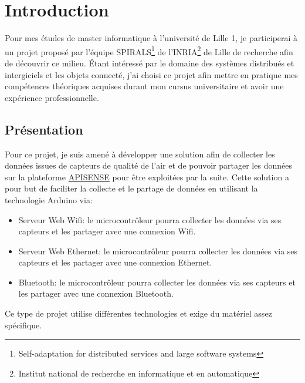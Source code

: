 \section{Introduction}

Pour mes études de master informatique à l'université de Lille 1, je participerai à un projet proposé par l'équipe SPIRALS\footnote{Self-adaptation for distributed services and large software systems} de l'INRIA\footnote{Institut national de recherche en informatique et en automatique} de Lille de recherche afin de découvrir ce milieu. 
Étant intéressé par le domaine des systèmes distribués et intergiciels et les objets connecté, j'ai choisi ce projet afin mettre en pratique mes compétences théoriques acquises durant mon cursus universitaire et avoir une expérience professionnelle. 

\subsection{Présentation}
Pour ce projet, je suis amené à développer une solution afin de collecter les données issues de capteurs de qualité de l'air et de pouvoir partager les données sur la plateforme \href{https://www.inria.fr/centre/lille/innovation/rii/rii-technologies-du-web/demos/apisense-r-accedez-a-une-foule-de-donnees-en-2-clics}{APISENSE} pour être exploitées par la suite.
Cette solution a pour but de faciliter la collecte et le partage de données en utilisant la technologie Arduino via:
\begin{itemize}
\item Serveur Web Wifi: le microcontrôleur pourra collecter les données via ses capteurs et les partager avec une connexion Wifi.
\item Serveur Web Ethernet: le microcontrôleur pourra collecter les données via ses capteurs et les partager avec une connexion Ethernet.
\item Bluetooth: le microcontrôleur pourra collecter les données via ses capteurs et les partager avec une connexion Bluetooth. 
\end{itemize}
Ce type de projet utilise différentes technologies et exige du matériel assez spécifique.


